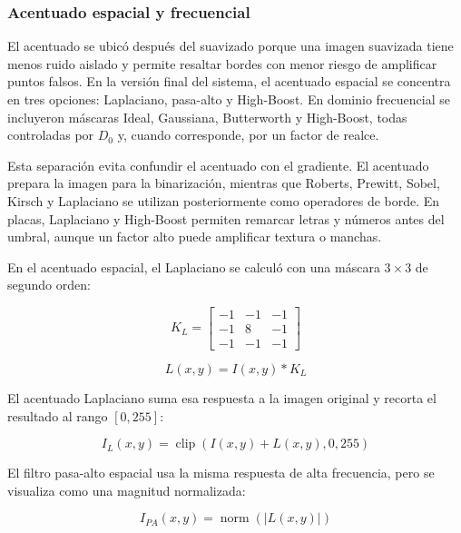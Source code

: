 \documentclass[11pt]{article}
\begin{document}
\subsubsection{Acentuado espacial y frecuencial}

El acentuado se ubicó después del suavizado porque una imagen suavizada tiene menos ruido aislado y permite resaltar bordes con menor riesgo de amplificar puntos falsos. En la versión final del sistema, el acentuado espacial se concentra en tres opciones: Laplaciano, pasa-alto y High-Boost. En dominio frecuencial se incluyeron máscaras Ideal, Gaussiana, Butterworth y High-Boost, todas controladas por $D_0$ y, cuando corresponde, por un factor de realce.

Esta separación evita confundir el acentuado con el gradiente. El acentuado prepara la imagen para la binarización, mientras que Roberts, Prewitt, Sobel, Kirsch y Laplaciano se utilizan posteriormente como operadores de borde. En placas, Laplaciano y High-Boost permiten remarcar letras y números antes del umbral, aunque un factor alto puede amplificar textura o manchas.

En el acentuado espacial, el Laplaciano se calculó con una máscara $3 \times 3$ de segundo orden:

\begin{equation}
    K_L=
    \begin{bmatrix}
        -1 & -1 & -1\\
        -1 &  8 & -1\\
        -1 & -1 & -1
    \end{bmatrix}
\end{equation}

\begin{equation}
    L(x,y)=I(x,y)*K_L
\end{equation}

El acentuado Laplaciano suma esa respuesta a la imagen original y recorta el resultado al rango $[0,255]$:

\begin{equation}
    I_L(x,y)=\operatorname{clip}(I(x,y)+L(x,y),0,255)
\end{equation}

El filtro pasa-alto espacial usa la misma respuesta de alta frecuencia, pero se visualiza como una magnitud normalizada:

\begin{equation}
    I_{PA}(x,y)=\operatorname{norm}(|L(x,y)|)
\end{equation}
\end{document}
